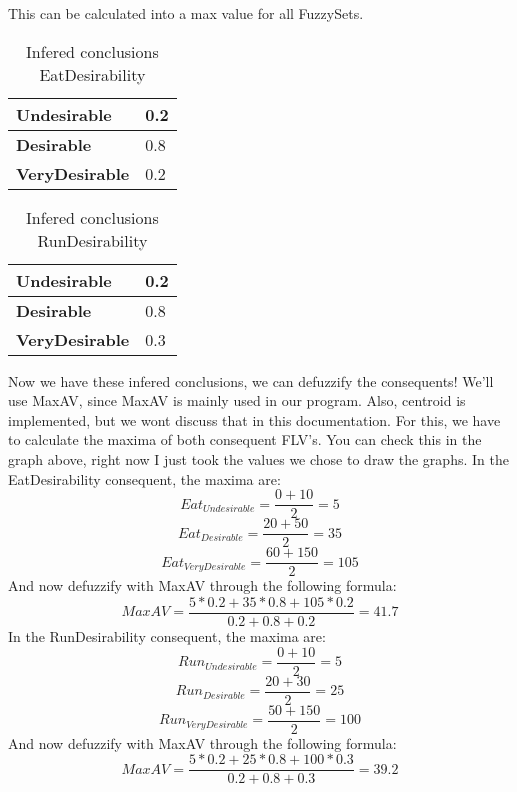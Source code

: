 This can be calculated into a max value for all FuzzySets.
\begin{table}[ht]
    \centering
    \label{InferedConclusionsEatDesirability}
    \begin{tabular}{|l|l|}
        \hline
        \textbf{Undesirable}   & 0.2 \\ \hline
        \textbf{Desirable}     & 0.8 \\ \hline
        \textbf{VeryDesirable} & 0.2 \\ \hline
    \end{tabular}
    \caption{Infered conclusions EatDesirability}
\end{table}
\begin{table}[ht]
    \centering
    \label{InferedConclusionsRunDesirability}
    \begin{tabular}{|l|l|}
        \hline
        \textbf{Undesirable}   & 0.2   \\ \hline
        \textbf{Desirable}     & 0.8 \\ \hline
        \textbf{VeryDesirable} & 0.3 \\ \hline
    \end{tabular}
    \caption{Infered conclusions RunDesirability}
\end{table}
Now we have these infered conclusions, we can defuzzify the consequents!
We'll use MaxAV, since MaxAV is mainly used in our program.
Also, centroid is implemented, but we wont discuss that in this documentation.
For this, we have to calculate the maxima of both consequent FLV's.
You can check this in the graph above, right now I just took the values we chose to draw the graphs.
In the EatDesirability consequent, the maxima are:
\begin{equation}
    Eat_{Undesirable} = \frac{0 + 10}2 = 5
\end{equation}
\begin{equation}
    Eat_{Desirable} = \frac{20 + 50}2 = 35
\end{equation}
\begin{equation}
    Eat_{VeryDesirable} = \frac{60 + 150}2 = 105
\end{equation}
And now defuzzify with MaxAV through the following formula:
\begin{equation}
    MaxAV = \frac{5 * 0.2 + 35 * 0.8 + 105 * 0.2}{0.2 + 0.8 + 0.2} = 41.7
\end{equation}
In the RunDesirability consequent, the maxima are:
\begin{equation}
    Run_{Undesirable} = \frac{0 + 10}2 = 5
\end{equation}
\begin{equation}
    Run_{Desirable} = \frac{20 + 30}2 = 25
\end{equation}
\begin{equation}
    Run_{VeryDesirable} = \frac{50 + 150}2 = 100
\end{equation}
And now defuzzify with MaxAV through the following formula:
\begin{equation}
    MaxAV = \frac{5 * 0.2 + 25 * 0.8 + 100 * 0.3}{0.2 + 0.8 + 0.3} = 39.2
\end{equation}
